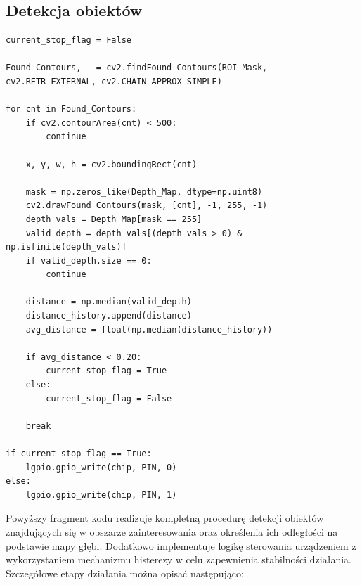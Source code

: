 \documentclass[magisterska]{pracadypl}
\begin{document}
\newpage

\subsection*{Detekcja obiektów}

\begin{lstlisting}[style=mypython]
current_stop_flag = False

Found_Contours, _ = cv2.findFound_Contours(ROI_Mask, cv2.RETR_EXTERNAL, cv2.CHAIN_APPROX_SIMPLE)

for cnt in Found_Contours:
    if cv2.contourArea(cnt) < 500:
        continue

    x, y, w, h = cv2.boundingRect(cnt)

    mask = np.zeros_like(Depth_Map, dtype=np.uint8)
    cv2.drawFound_Contours(mask, [cnt], -1, 255, -1)
    depth_vals = Depth_Map[mask == 255]
    valid_depth = depth_vals[(depth_vals > 0) & np.isfinite(depth_vals)]
    if valid_depth.size == 0:
        continue

    distance = np.median(valid_depth)
    distance_history.append(distance)
    avg_distance = float(np.median(distance_history))

    if avg_distance < 0.20:
        current_stop_flag = True
    else:
        current_stop_flag = False

    break

if current_stop_flag == True:
    lgpio.gpio_write(chip, PIN, 0)
else:
    lgpio.gpio_write(chip, PIN, 1)
\end{lstlisting}

Powyższy fragment kodu realizuje kompletną procedurę detekcji obiektów znajdujących się w obszarze zainteresowania oraz określenia ich odległości na podstawie mapy głębi. Dodatkowo implementuje logikę sterowania urządzeniem z wykorzystaniem mechanizmu histerezy w celu zapewnienia stabilności działania. Szczegółowe etapy działania można opisać następująco:
\end{document}
